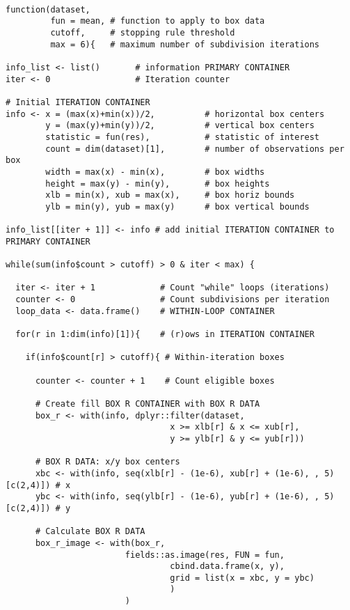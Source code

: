 \begin{verbatim}

function(dataset, 
         fun = mean, # function to apply to box data
         cutoff,     # stopping rule threshold
         max = 6){   # maximum number of subdivision iterations

info_list <- list()       # information PRIMARY CONTAINER
iter <- 0                 # Iteration counter

# Initial ITERATION CONTAINER
info <- x = (max(x)+min(x))/2,          # horizontal box centers
        y = (max(y)+min(y))/2,          # vertical box centers
        statistic = fun(res),           # statistic of interest
        count = dim(dataset)[1],        # number of observations per box
        width = max(x) - min(x),        # box widths
        height = max(y) - min(y),       # box heights
        xlb = min(x), xub = max(x),     # box horiz bounds 
        ylb = min(y), yub = max(y)      # box vertical bounds

info_list[[iter + 1]] <- info # add initial ITERATION CONTAINER to PRIMARY CONTAINER

while(sum(info$count > cutoff) > 0 & iter < max) {

  iter <- iter + 1             # Count "while" loops (iterations)
  counter <- 0                 # Count subdivisions per iteration
  loop_data <- data.frame()    # WITHIN-LOOP CONTAINER

  for(r in 1:dim(info)[1]){    # (r)ows in ITERATION CONTAINER

    if(info$count[r] > cutoff){ # Within-iteration boxes

      counter <- counter + 1    # Count eligible boxes

      # Create fill BOX R CONTAINER with BOX R DATA
      box_r <- with(info, dplyr::filter(dataset,
                                 x >= xlb[r] & x <= xub[r],
                                 y >= ylb[r] & y <= yub[r]))

      # BOX R DATA: x/y box centers
      xbc <- with(info, seq(xlb[r] - (1e-6), xub[r] + (1e-6), , 5)[c(2,4)]) # x
      ybc <- with(info, seq(ylb[r] - (1e-6), yub[r] + (1e-6), , 5)[c(2,4)]) # y

      # Calculate BOX R DATA
      box_r_image <- with(box_r,
                        fields::as.image(res, FUN = fun,
                                 cbind.data.frame(x, y),
                                 grid = list(x = xbc, y = ybc)
                                 )
                        )


\end{verbatim}
